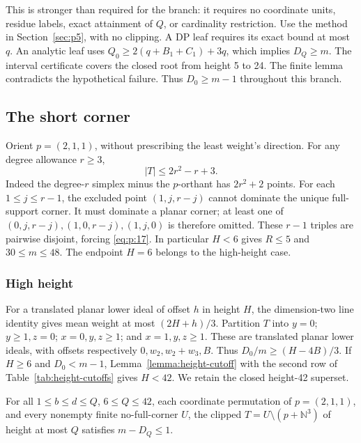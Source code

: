 This is stronger than required for the branch: it requires no coordinate
units, residue labels, exact attainment of \(Q\), or cardinality restriction.
Use the method in Section~\ref{sec:p5}, with no clipping.
A DP leaf requires its exact bound at most \(q\).
An analytic leaf uses
\(Q_0\ge2(q+B_1+C_1)+3q\), which implies \(D_Q\ge m\).
The interval certificate covers the closed root from height 5 to 24.
The finite lemma contradicts the hypothetical failure.
Thus \(D_0\ge m-1\) throughout this branch.

\subsection{The short corner}\label{sec:p9}

Orient \(p=(2,1,1)\), without prescribing the least weight's direction.
For any degree allowance \(r\ge3\),
\begin{equation}
|T|\le2r^2-r+3.
\label{eq:p:17}
\end{equation}
Indeed the degree-\(r\) simplex minus the \(p\)-orthant has \(2r^2+2\)
points. For each \(1\le j\le r-1\), the excluded point \((1,j,r-j)\)
cannot dominate the unique full-support corner.
It must dominate a planar corner; at least one of
\((0,j,r-j),(1,0,r-j),(1,j,0)\) is therefore omitted.
These \(r-1\) triples are pairwise disjoint, forcing \eqref{eq:p:17}.
In particular \(H<6\) gives \(R\le5\) and \(30\le m\le48\).
The endpoint \(H=6\) belongs to the high-height case.

\subsubsection{High height}

For a translated planar lower ideal of offset \(h\) in height \(H\),
the dimension-two line identity gives mean weight at most \((2H+h)/3\).
Partition \(T\) into \(y=0\); \(y\ge1,z=0\);
\(x=0,y,z\ge1\); and \(x=1,y,z\ge1\).
These are translated planar lower ideals, with offsets respectively
\(0,w_2,w_2+w_3,B\). Thus \(D_0/m\ge(H-4B)/3\).
If \(H\ge6\) and \(D_0<m-1\), Lemma~\ref{lemma:height-cutoff}
with the second row of Table~\ref{tab:height-cutoffs} gives \(H<42\).
We retain the closed height-42 superset.

\begin{finitelemma}\label{finite:short-corner-high}
For all
\(1\le b\le d\le Q\), \(6\le Q\le42\), each coordinate permutation of
\(p=(2,1,1)\), and every nonempty finite no-full-corner \(U\),
the clipped \(T=U\setminus(p+\mathbb N^3)\) of height at most \(Q\)
satisfies \(m-D_Q\le1\).

\end{finitelemma}

